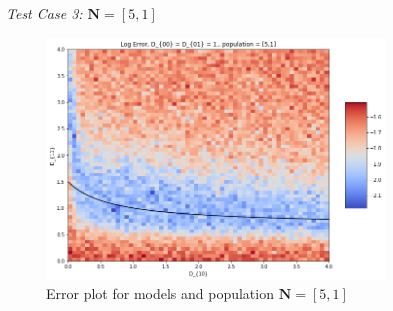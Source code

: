 \textit{{\large Test Case 3: \(\mathbf{N} = [5,1]\)}}\\

\begin{figure}[!htb]
\begin{center}
    \centering
    \includegraphics[width=0.8\textwidth]{Chap6_EvaluationAndAnalysis/images/error_analysis_bottleneck_pop_51.png}
\caption{Error plot for models and population \(\mathbf{N}=[5,1]\)}
\label{fig:bottleneck_analysis_pop_51}
\end{center}
\end{figure}


